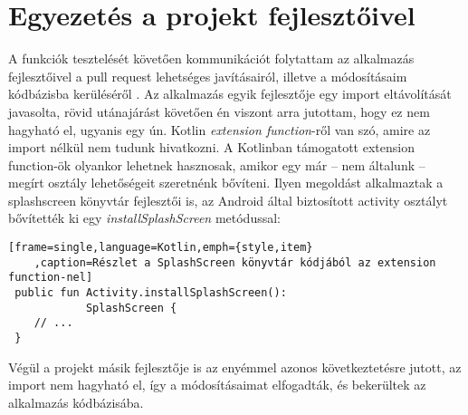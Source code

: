 \section{Egyezetés a projekt fejlesztőivel}
A funkciók tesztelését követően kommunikációt folytattam az alkalmazás fejlesztőivel a pull request lehetséges
javításairól, illetve a módosításaim kódbázisba kerüléséről \cite{pullrequest}. Az alkalmazás egyik fejlesztője egy import
eltávolítását javasolta, rövid utánajárást követően \cite{extensionfunction} én viszont arra jutottam, hogy ez nem
hagyható el, ugyanis egy ún. Kotlin \textit{extension function}-ről van szó, amire az import
nélkül nem tudunk hivatkozni. A Kotlinban támogatott extension function-ök olyankor lehetnek
hasznosak, amikor egy már -- nem általunk -- megírt osztály lehetőségeit szeretnénk bővíteni.
Ilyen megoldást alkalmaztak a \gls{splashscreen} könyvtár \cite{splashscreenreference} fejlesztői is, az Android által biztosított
\gls{activity} osztályt bővítették ki egy \textit{installSplashScreen} metódussal:

\begin{lstlisting}[frame=single,language=Kotlin,emph={style,item}
    ,caption=Részlet a SplashScreen könyvtár kódjából az extension function-nel]
 public fun Activity.installSplashScreen():
            SplashScreen {
    // ...
 }
\end{lstlisting}

Végül a projekt másik fejlesztője is az enyémmel azonos következtetésre jutott, az import
nem hagyható el, így a módosításaimat elfogadták, és bekerültek az alkalmazás kódbázisába.

